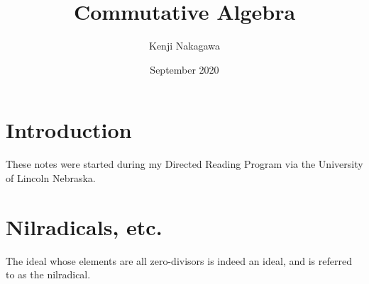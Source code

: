 \documentclass{article}
\title{Commutative Algebra}
\author{Kenji Nakagawa}
\date{September 2020}
\begin{document}
\maketitle
\tableofcontents

\section*{Introduction}
These notes were started during my Directed Reading Program via the University of Lincoln Nebraska. 

\section{Nilradicals, etc.}

The ideal whose elements are all zero-divisors is indeed an ideal, and is referred to as the nilradical.
\end{document}
